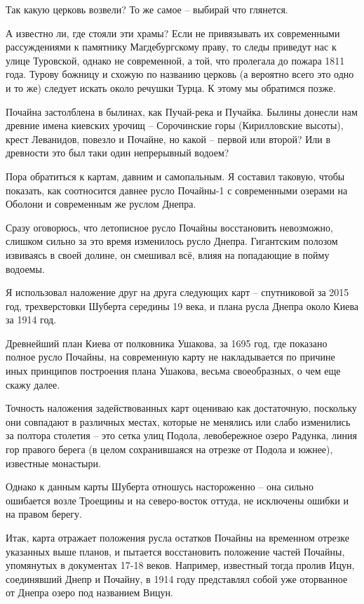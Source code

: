 Так какую церковь возвели? То же самое – выбирай что глянется.

А известно ли, где стояли эти храмы? Если не привязывать их современными рассуждениями к памятнику Магдебургскому праву, то следы приведут нас к улице Туровской, однако не современной, а той, что пролегала до пожара 1811 года. Турову божницу и схожую по названию церковь (а вероятно всего это одно и то же) следует искать около речушки Турца. К этому мы обратимся позже.

Почайна застолблена в былинах, как Пучай-река и Пучайка. Былины донесли нам древние имена киевских урочищ – Сорочинские горы (Кирилловские высоты), крест Леванидов, повезло и Почайне, но какой – первой или второй? Или в древности это был таки один непрерывный водоем?

Пора обратиться к картам, давним и самопальным. Я составил таковую, чтобы показать, как соотносится давнее русло Почайны-1 с современными озерами на Оболони и современным же руслом Днепра.

Сразу оговорюсь, что летописное русло Почайны восстановить невозможно, слишком сильно за это время изменилось русло Днепра. Гигантским полозом извиваясь в своей долине, он смешивал всё, влияя на попадающие в пойму водоемы.

Я использовал наложение друг на друга следующих карт – спутниковой за 2015 год, трехверстовки Шуберта середины 19 века, и плана русла Днепра около Киева за 1914 год.

Древнейший план Киева от полковника Ушакова, за 1695 год, где показано полное русло Почайны, на современную карту не накладывается по причине иных принципов построения плана Ушакова, весьма своеобразных, о чем еще скажу далее.

Точность наложения задействованных карт оцениваю как достаточную, поскольку они совпадают в различных местах, которые не менялись или слабо изменились за полтора столетия – это сетка улиц Подола, левобережное озеро Радунка, линия гор правого берега (в целом сохранившаяся на отрезке от Подола и южнее), известные монастыри. 

Однако к данным карты Шуберта отношусь настороженно – она сильно ошибается возле Троещины и на северо-восток оттуда, не исключены ошибки и на правом берегу.

Итак, карта отражает положения русла остатков Почайны на временном отрезке указанных выше планов, и пытается восстановить положение частей Почайны, упомянутых в документах 17-18 веков. Например, известный тогда пролив Ицун, соединявший Днепр и Почайну, в 1914 году представлял собой уже оторванное от Днепра озеро под названием Вицун.

